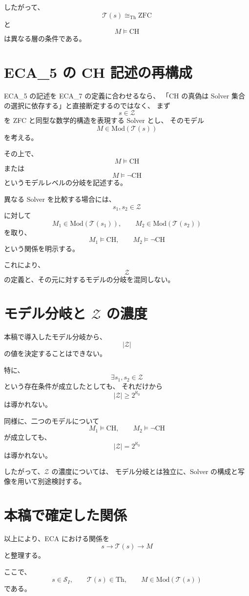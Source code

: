 \documentclass[a4paper,11pt]{article}
\newcommand{\Solver}{\mathcal{S}}
\newcommand{\Th}{\mathrm{Th}}
\newcommand{\Mod}{\mathrm{Mod}}
\begin{document}
したがって、
\[
\boxed{
\mathcal{T}(s)\cong_{\mathrm{Th}}\mathrm{ZFC}
}
\]
と
\[
\boxed{
M\models\mathrm{CH}
}
\]
は異なる層の条件である。

\section{ECA_5 の CH 記述の再構成}

ECA_5 の記述を ECA_7 の定義に合わせるなら、
「CH の真偽は Solver 集合の選択に依存する」と直接断定するのではなく、
まず
\[
s\in\mathcal{Z}
\]
を ZFC と同型な数学的構造を表現する Solver とし、
そのモデル
\[
M\in\Mod(\mathcal{T}(s))
\]
を考える。

その上で、
\[
M\models\mathrm{CH}
\]
または
\[
M\models\neg\mathrm{CH}
\]
というモデルレベルの分岐を記述する。

異なる Solver を比較する場合には、
\[
s_1,s_2\in\mathcal{Z}
\]
に対して
\[
M_1\in\Mod(\mathcal{T}(s_1)),
\qquad
M_2\in\Mod(\mathcal{T}(s_2))
\]
を取り、
\[
M_1\models\mathrm{CH},
\qquad
M_2\models\neg\mathrm{CH}
\]
という関係を明示する。

これにより、
\[
\mathcal{Z}
\]
の定義と、その元に対するモデルの分岐を混同しない。

\section{モデル分岐と $\mathcal{Z}$ の濃度}

本稿で導入したモデル分岐から、
\[
|\mathcal{Z}|
\]
の値を決定することはできない。

特に、
\[
\exists s_1,s_2\in\mathcal{Z}
\]
という存在条件が成立したとしても、
それだけから
\[
|\mathcal{Z}|\geq2^{\aleph_0}
\]
は導かれない。

同様に、二つのモデルについて
\[
M_1\models\mathrm{CH},
\qquad
M_2\models\neg\mathrm{CH}
\]
が成立しても、
\[
|\mathcal{Z}|=2^{\aleph_0}
\]
は導かれない。

したがって、$\mathcal{Z}$ の濃度については、
モデル分岐とは独立に、Solver の構成と写像を用いて別途検討する。

\section{本稿で確定した関係}

以上により、ECA における関係を
\[
\boxed{
s
\longrightarrow
\mathcal{T}(s)
\longrightarrow
M
}
\]
と整理する。

ここで、
\[
s\in\Solver_I,\qquad
\mathcal{T}(s)\in\Th,\qquad
M\in\Mod(\mathcal{T}(s))
\]
である。
\end{document}

